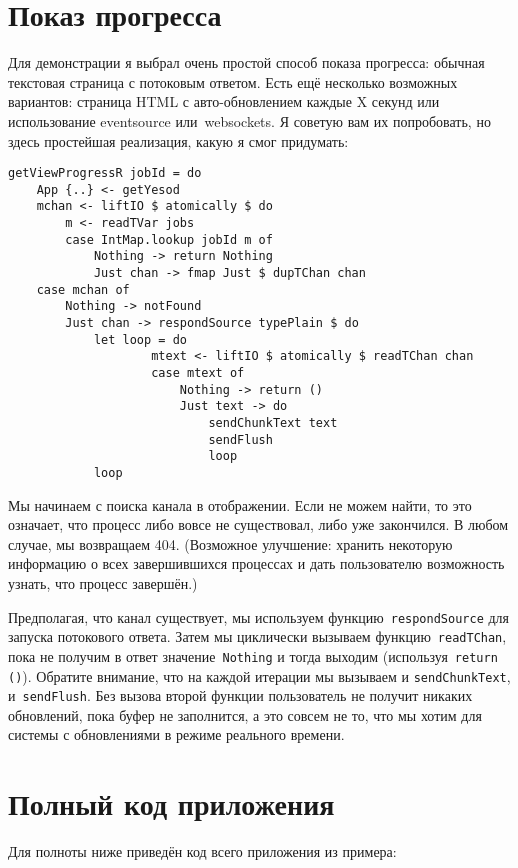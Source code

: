 \section{Показ прогресса}

Для демонстрации я выбрал очень простой способ показа прогресса: обычная
текстовая страница с потоковым ответом. Есть ещё несколько возможных вариантов:
страница HTML с авто-обновлением каждые X секунд или использование eventsource
или~websockets. Я советую вам их попробовать, но здесь простейшая реализация,
какую я смог придумать:
\begin{lstlisting}
getViewProgressR jobId = do
    App {..} <- getYesod
    mchan <- liftIO $ atomically $ do
        m <- readTVar jobs
        case IntMap.lookup jobId m of
            Nothing -> return Nothing
            Just chan -> fmap Just $ dupTChan chan
    case mchan of
        Nothing -> notFound
        Just chan -> respondSource typePlain $ do
            let loop = do
                    mtext <- liftIO $ atomically $ readTChan chan
                    case mtext of
                        Nothing -> return ()
                        Just text -> do
                            sendChunkText text
                            sendFlush
                            loop
            loop
\end{lstlisting}

Мы начинаем с поиска канала в отображении. Если не можем найти, то это
означает, что процесс либо вовсе не существовал, либо уже закончился. В любом
случае, мы возвращаем 404. (Возможное улучшение: хранить некоторую информацию о
всех завершившихся процессах и дать пользователю возможность узнать, что
процесс завершён.)

Предполагая, что канал существует, мы используем
функцию~\lstinline'respondSource' для запуска потокового ответа. Затем мы
циклически вызываем функцию~\lstinline'readTChan', пока не получим в ответ
значение~\lstinline'Nothing' и тогда выходим (используя~\lstinline'return ()').
Обратите внимание, что на каждой итерации мы вызываем и
\lstinline'sendChunkText', и~\lstinline'sendFlush'. Без вызова второй функции
пользователь не получит никаких обновлений, пока буфер не заполнится, а это
совсем не то, что мы хотим для системы с обновлениями в режиме реального
времени.

\section{Полный код приложения}

Для полноты ниже приведён код всего приложения из примера:

